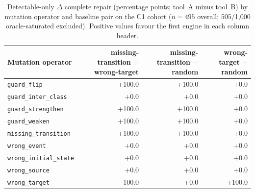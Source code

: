 \begin{table}[t]
\caption{Detectable-only $\Delta$ complete repair (percentage points; tool~A minus tool~B) by mutation operator and baseline pair on the C1 cohort ($n=495$ overall; 505/1{,}000 oracle-saturated excluded). Positive values favour the first engine in each column header.}
\label{tab:baseline-delta-by-operator}
\begin{tabular}{@{}lrrr@{}}
\toprule
Mutation operator & missing-transition $-$ wrong-target & missing-transition $-$ random & wrong-target $-$ random \\
\midrule
\texttt{guard\_flip} & +100.0 & +100.0 & +0.0 \\
\texttt{guard\_inter\_class} & +0.0 & +0.0 & +0.0 \\
\texttt{guard\_strengthen} & +100.0 & +100.0 & +0.0 \\
\texttt{guard\_weaken} & +100.0 & +100.0 & +0.0 \\
\texttt{missing\_transition} & +100.0 & +100.0 & +0.0 \\
\texttt{wrong\_event} & +0.0 & +0.0 & +0.0 \\
\texttt{wrong\_initial\_state} & +0.0 & +0.0 & +0.0 \\
\texttt{wrong\_source} & +0.0 & +0.0 & +0.0 \\
\texttt{wrong\_target} & -100.0 & +0.0 & +100.0 \\
\bottomrule
\end{tabular}
\end{table}
